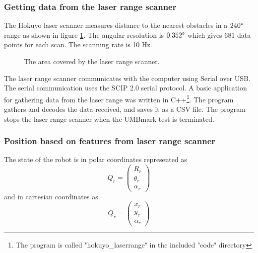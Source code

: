 \subsubsection{Getting data from the laser range scanner}
The Hokuyo laser scanner measures distance to the nearest obstacles in a $240 \degree$ range as shown in figure \ref{fig:laserrange_angle}. The angular resolution is $0.352 \degree$ which gives 681 data points for each scan. The scanning rate is 10 Hz.

\begin{figure}
 \centering
 \caption{The area covered by the laser range scanner.}
 \label{fig:laserrange_angle}
 \end{figure}

The laser range scanner communicates with the computer using Serial over USB. The serial communication uses the SCIP 2.0 serial protocol. 
A basic application for gathering data from the laser range was written
in C++\footnote{The program is called "hokuyo\_laserrange" in the included "code" directory}.
The program gathers and decodes the data received, and saves it as a CSV file.
The program stops the laser range scanner when the UMBmark test is terminated.



\subsubsection{Position based on features from laser range scanner}
The state of the robot is in polar coordinates represented  as 
$$Q_r = \begin{pmatrix}
R_r\\
\theta_r\\
\alpha_r
\end{pmatrix}$$ 
and in cartesian coordinates as 
$$Q_r = \begin{pmatrix}
x_r\\
y_r\\
\alpha_r
\end{pmatrix}$$

